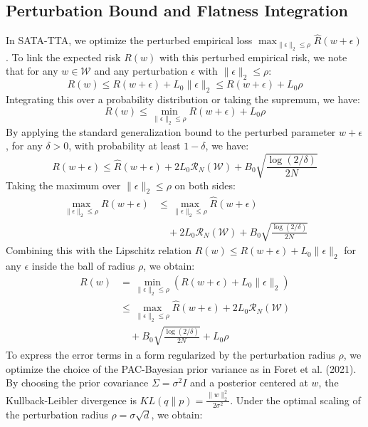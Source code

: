\documentclass{article}
\theoremstyle{plain}
\theoremstyle{definition}
\theoremstyle{remark}
\begin{document}
\subsection{Perturbation Bound and Flatness Integration}
In SATA-TTA, we optimize the perturbed empirical loss $\max_{\|\epsilon\|_2 \le \rho} \hat{R}(w + \epsilon)$. To link the expected risk $R(w)$ with this perturbed empirical risk, we note that for any $w \in \mathcal{W}$ and any perturbation $\epsilon$ with $\|\epsilon\|_2 \le \rho$:
\begin{equation}
  R(w) \le R(w + \epsilon) + L_0 \|\epsilon\|_2 \le R(w + \epsilon) + L_0 \rho
\end{equation}
Integrating this over a probability distribution or taking the supremum, we have:
\begin{equation}
  R(w) \le \min_{\|\epsilon\|_2 \le \rho} R(w + \epsilon) + L_0 \rho
\end{equation}
By applying the standard generalization bound to the perturbed parameter $w + \epsilon$, for any $\delta > 0$, with probability at least $1 - \delta$, we have:
\begin{equation}
  R(w + \epsilon) \le \hat{R}(w + \epsilon) + 2 L_0 \mathcal{R}_N(\mathcal{W}) + B_0 \sqrt{\frac{\log(2/\delta)}{2N}}
\end{equation}
Taking the maximum over $\|\epsilon\|_2 \le \rho$ on both sides:
\begin{equation}
\begin{split}
  \max_{\|\epsilon\|_2 \le \rho} R(w + \epsilon) &\le \max_{\|\epsilon\|_2 \le \rho} \hat{R}(w + \epsilon) \\
  &\quad + 2 L_0 \mathcal{R}_N(\mathcal{W}) + B_0 \sqrt{\frac{\log(2/\delta)}{2N}}
\end{split}
\end{equation}
Combining this with the Lipschitz relation $R(w) \le R(w + \epsilon) + L_0 \|\epsilon\|_2$ for any $\epsilon$ inside the ball of radius $\rho$, we obtain:
\begin{equation}
\begin{split}
  R(w) &= \min_{\|\epsilon\|_2 \le \rho} (R(w + \epsilon) + L_0 \|\epsilon\|_2) \\
  &\le \max_{\|\epsilon\|_2 \le \rho} \hat{R}(w + \epsilon) + 2 L_0 \mathcal{R}_N(\mathcal{W}) \\
  &\quad + B_0 \sqrt{\frac{\log(2/\delta)}{2N}} + L_0 \rho
\end{split}
\end{equation}
To express the error terms in a form regularized by the perturbation radius $\rho$, we optimize the choice of the PAC-Bayesian prior variance as in Foret et al. (2021). By choosing the prior covariance $\Sigma = \sigma^2 I$ and a posterior centered at $w$, the Kullback-Leibler divergence is $KL(q \parallel p) = \frac{\|w\|_2^2}{2\sigma^2}$. Under the optimal scaling of the perturbation radius $\rho = \sigma \sqrt{d}$, we obtain:
\end{document}
